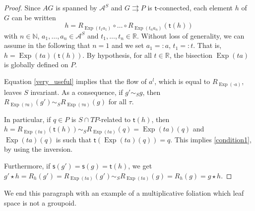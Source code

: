 \documentclass{amsart}
\theoremstyle{definition}
\begin{document}
\begin{proof}
Since $AG$ is spanned by $\mathcal A^S$ and 
 $G{{\rightrightarrows}} P$ is ${{\mathsf{t}}}$-connected, 
each element $h$ of $G$ can  be written 
\[ h=R_{\operatorname{Exp}(t_1a_1)}\circ \ldots\circ R_{\operatorname{Exp}(t_na_n)}({{\mathsf{t}}}(h))\]
with $n\in{\mathbb{N}}$, $a_1,\ldots,a_n\in\mathcal A^S$ and $t_1,\ldots,t_n\in {\mathbb{R}}$.
Without loss of generality, we can assume in the following that $n=1$ and we set $a_1=:a$, $t_1=:t$.
That is, $h=\operatorname{Exp}(ta)({{\mathsf{t}}}(h))$. By hypothesis, for all $t\in {\mathbb{R}}$, the bisection $\operatorname{Exp}(ta)$ is globally
defined on $P$.

Equation \eqref{very_useful} implies that the flow of $a^l$, which is 
equal to $R_{\operatorname{Exp}(\cdot a)}$, leaves $S$ invariant. As a consequence,
if $g'\sim_S g$, then 
$ R_{\operatorname{Exp}(\tau a)}(g')\sim_S  R_{\operatorname{Exp}(\tau a)}(g)$ for all $\tau$.

In particular,  if $q\in P$ is  $S\cap TP$-related to ${{\mathsf{t}}}(h)$, then 
$h=R_{\operatorname{Exp}(t a)}({{\mathsf{t}}}(h))\sim_S  R_{\operatorname{Exp}(t a)}(q)=\operatorname{Exp}(ta)(q)$
and $\operatorname{Exp}(ta)(q)$ is such that ${{\mathsf{t}}}\left(\operatorname{Exp}(ta)(q)\right)=q$. This implies \eqref{condition1}, by using the inversion.

Furthermore, if ${{\mathsf{s}}}(g')={{\mathsf{s}}}(g)={{\mathsf{t}}}(h)$, we get 
$g'\star h=R_h(g')= R_{\operatorname{Exp}(t a)}(g')\sim_S R_{\operatorname{Exp}(t a)}(g)=R_h(g)=g\star h$.
\end{proof}

We end this paragraph with an example of a multiplicative foliation which leaf space is not a groupoid.
\end{document}
